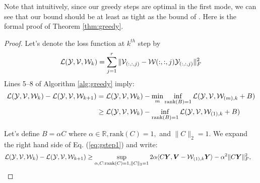 Note that intuitively, since our greedy steps are optimal in the first mode, we can see that our bound should be at least as tight as the bound of \cite{Shwartz11}.  Here is the formal proof of Theorem \ref{thm:greedy}.
\begin{proof} Let's denote the loss function at $k^{th}$ step by 
\begin{equation}
\mathcal{L}({\mathcal Y}, {\mathcal V}, \mathcal{W}_{k}) = \sum_{j=1}^{r}\|{\mathcal V}_{(:, :, j)} - \mathcal{W}(:, :, j){\mathcal Y}_{(:, :, j)}\|_F^2
\end{equation}
Lines 5--8 of Algorithm \ref{alg:greedy} imply:
\begin{align}
\mathcal{L}({\mathcal Y}, {\mathcal V}, \mathcal{W}_{k}) - \mathcal{L}({\mathcal Y}, {\mathcal V}, {\mathcal W}_{k+1})&= \mathcal{L}({\mathcal Y}, {\mathcal V}, \mathcal{W}_{k}) - \min_{m}\inf_{\mathrm{rank}(B) = 1}\mathcal{L}({\mathcal Y}, {\mathcal V},  {\mathcal W}_{(m), k}+B)\nonumber\\
&\geq \mathcal{L}({\mathcal Y}, {\mathcal V}, \mathcal{W}_{k}) - \inf_{\mathrm{rank}(B) = 1}\mathcal{L}({\mathcal Y}, {\mathcal V},  {\mathcal W}_{(1), k}+B)\label{eq:gstep1} 
\end{align}

Let's define $B = \alpha C$ where $\alpha \in \mathbb{R},\mathrm{rank}(C) = 1,$ and $\|C\|_2 = 1$.  We expand the right hand side of Eq. (\ref{eq:gstep1}) and write: 
\begin{align*}
&\mathcal{L}({\mathcal Y}, {\mathcal V}, {\mathcal W}_{k}) - \mathcal{L}({\mathcal Y}, {\mathcal V}, {\mathcal W}_{k+1})\geq \sup_{\alpha, C: \mathrm{rank}(C) = 1, \|C\|_2 = 1} 2\alpha\langle C\bm{Y}, \bm{V} - {\mathcal W}_{(1), k}\bm{Y}\rangle - \alpha^2\|C\bm{Y}\|_F^2  ,
\end{align*}


\end{proof}
